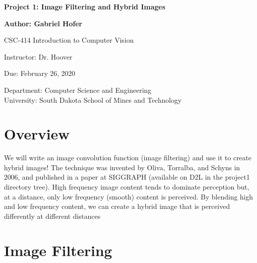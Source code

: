 \documentclass[12pt]{article}
\begin{document}
\begin{titlepage}
   \begin{center}
       \vspace*{1cm}
       \large
       \textbf{Project 1: Image Filtering and Hybrid Images}
       \normalsize

       \vspace{0.5cm}

       \textbf{Author: Gabriel Hofer}

       \vspace{0.5cm}

       CSC-414 Introduction to Computer Vision

       \vspace{0.5cm}

       Instructor: Dr. Hoover

       \vspace{0.5cm}

       Due: February 26, 2020

       \vfill

       Department: Computer Science and Engineering\\
       University: South Dakota School of Mines and Technology\\
   \end{center}
\end{titlepage}


\newpage
\section{Overview}
We will write an image convolution function (image filtering) and use it to create hybrid
images! The technique was invented by Oliva, Torralba, and Schyns in 2006, and published
in a paper at SIGGRAPH (available on D2L in the project1 directory tree). High frequency
image content tends to dominate perception but, at a distance, only low frequency (smooth)
content is perceived. By blending high and low frequency content, we can create a hybrid
image that is perceived differently at different distances

\section{Image Filtering}
\end{document}
